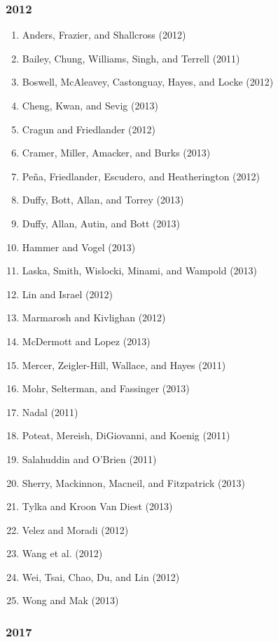\documentclass[english,man]{apa6}
\providecommand{\tightlist}{%
  \setlength{\itemsep}{0pt}\setlength{\parskip}{0pt}}
\theoremstyle{definition}
\theoremstyle{definition}
\theoremstyle{definition}
\theoremstyle{remark}
\begin{document}
\subsubsection{2012}\label{section-8}

\begin{enumerate}
\def\labelenumi{\arabic{enumi})}
\tightlist
\item
  Anders, Frazier, and Shallcross (2012)
\item
  Bailey, Chung, Williams, Singh, and Terrell (2011)
\item
  Boswell, McAleavey, Castonguay, Hayes, and Locke (2012)
\item
  Cheng, Kwan, and Sevig (2013)
\item
  Cragun and Friedlander (2012)
\item
  Cramer, Miller, Amacker, and Burks (2013)
\item
  Peña, Friedlander, Escudero, and Heatherington (2012)
\item
  Duffy, Bott, Allan, and Torrey (2013)
\item
  Duffy, Allan, Autin, and Bott (2013)
\item
  Hammer and Vogel (2013)
\item
  Laska, Smith, Wislocki, Minami, and Wampold (2013)
\item
  Lin and Israel (2012)
\item
  Marmarosh and Kivlighan (2012)
\item
  McDermott and Lopez (2013)
\item
  Mercer, Zeigler-Hill, Wallace, and Hayes (2011)
\item
  Mohr, Selterman, and Fassinger (2013)
\item
  Nadal (2011)
\item
  Poteat, Mereish, DiGiovanni, and Koenig (2011)
\item
  Salahuddin and O'Brien (2011)
\item
  Sherry, Mackinnon, Macneil, and Fitzpatrick (2013)
\item
  Tylka and Kroon Van Diest (2013)
\item
  Velez and Moradi (2012)
\item
  Wang et al. (2012)
\item
  Wei, Tsai, Chao, Du, and Lin (2012)
\item
  Wong and Mak (2013)
\end{enumerate}

\subsubsection{2017}\label{section-9}
\end{document}
